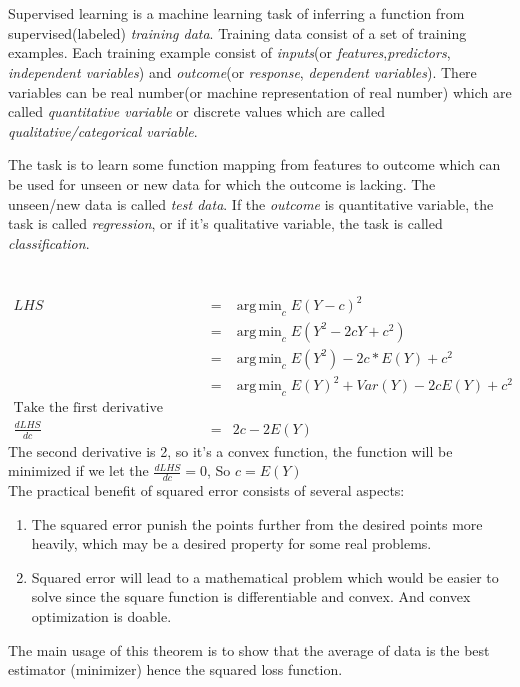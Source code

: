 \documentclass[12pt]{article}
\DeclareMathOperator*{\argmin}{arg\,min}
\begin{document}
\makehwtitle%
\section{}
Supervised learning is a machine learning task of inferring a function from supervised(labeled) \emph{training data}. Training data consist of a set of training examples. Each training example consist of \emph{inputs}(or \emph{features},\emph{predictors}, \emph{independent variables}) and \emph{outcome}(or \emph{response}, \emph{dependent variables}).
There variables can be real number(or machine representation of real number) which are called \emph{quantitative variable} or discrete values which are called \emph{qualitative/categorical variable}. 

The task is to learn some function mapping from features to outcome which can be used for unseen or new data for which the outcome is lacking. The unseen/new data is called \emph{test data}. If the \emph{outcome} is quantitative variable, the task is called \emph{regression}, or if it's qualitative variable, the task is called \emph{classification}. 
\section{}
\begin{eqnarray*}
    LHS &=& \argmin_c{E(Y-c)^2} \\
    &=& \argmin_c{E(Y^2 - 2cY +c^2)} \\
    &=& \argmin_c{E(Y^2) - 2c*E(Y) + c^2} \\
    &=& \argmin_c{E(Y)^2 + Var(Y) - 2cE(Y) + c^2} \\
    \text{Take the first derivative according to c}\\
    \frac{d LHS}{d c} &=&  2c - 2E(Y) 
\end{eqnarray*}
    The second derivative is 2, so it's a convex function, the function will be minimized if we let the $\frac{dLHS}{dc} = 0$,
    So $c = E(Y)$\\
The practical benefit of squared error consists of several aspects:
\begin{enumerate}
    \item The squared error punish the points further from the desired points more heavily, which may be a desired property for some real problems. 
    \item Squared error will lead to a mathematical problem which would be easier to solve since the square function is differentiable and convex. And convex optimization is doable.
\end{enumerate} 
The main usage of this theorem is to show that the average of data is the best estimator (minimizer) hence the squared loss function.
\end{document}
